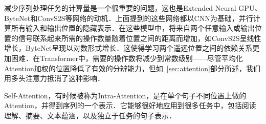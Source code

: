 
减少序列处理任务的计算量是一个很重要的问题，这也是Extended Neural GPU\citep{extendedngpu}、ByteNet\citep{NalBytenet2017}和ConvS2S\citep{JonasFaceNet2017}等网络的动机．上面提到的这些网络都以CNN为基础，并行计算所有输入和输出位置的隐藏表示．在这些模型中，将来自两个任意输入或输出位置的信号联系起来所需的操作数量随着位置之间的距离而增加，如ConvS2S呈线性增长，ByteNet呈现以对数形式增长．这使得学习两个遥远位置之间的依赖关系更加困难\citep{hochreiter2001gradient}．在Transformer中，需要的操作数将减少到常数级别——尽管平均化Attention加权的位置降低了有效的分辨能力，但如~\ref{sec:attention}部分所述，我们用多头注意力抵消了这种影响． %


Self-Attention，有时候被称为Intra-Attention，是在单个句子不同位置上做的Attention，并得到序列的一个表示．它能够很好地应用到很多任务中，包括阅读理解、摘要、文本蕴涵，以及独立于任务的句子表示．\citep{cheng2016long, decomposableAttnModel, paulus2017deep, lin2017structured}



